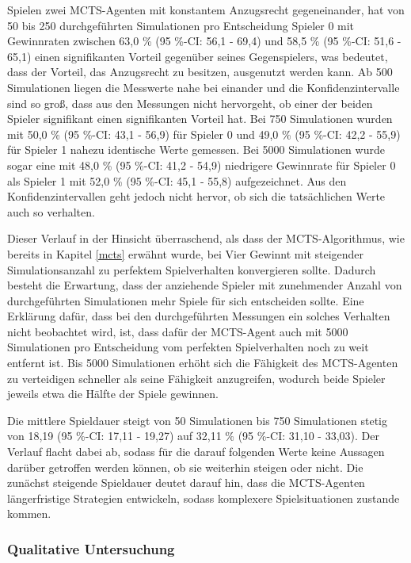 Spielen zwei MCTS-Agenten mit konstantem Anzugsrecht gegeneinander, hat von 50 bis 250 durchgeführten Simulationen pro Entscheidung Spieler 0 mit Gewinnraten zwischen 63,0 \% (95 \%-CI: 56,1 - 69,4) und 58,5 \% (95 \%-CI: 51,6 - 65,1) einen signifikanten Vorteil gegenüber seines Gegenspielers, was bedeutet, dass der Vorteil, das Anzugsrecht zu besitzen, ausgenutzt werden kann. Ab 500 Simulationen liegen die Messwerte nahe bei einander und die Konfidenzintervalle sind so groß, dass aus den Messungen nicht hervorgeht, ob einer der beiden Spieler signifikant einen signifikanten Vorteil hat. Bei 750 Simulationen wurden mit 50,0 \% (95 \%-CI: 43,1 - 56,9) für Spieler 0 und 49,0 \% (95 \%-CI: 42,2 - 55,9) für Spieler 1 nahezu identische Werte gemessen. Bei 5000 Simulationen wurde sogar eine mit 48,0 \% (95 \%-CI: 41,2 - 54,9) niedrigere Gewinnrate für Spieler 0 als Spieler 1 mit 52,0 \% (95 \%-CI: 45,1 - 55,8) aufgezeichnet. Aus den Konfidenzintervallen geht jedoch nicht hervor, ob sich die tatsächlichen Werte auch so verhalten.

Dieser Verlauf in der Hinsicht überraschend, als dass der MCTS-Algorithmus, wie bereits in Kapitel \ref{mcts} erwähnt wurde, bei Vier Gewinnt mit steigender Simulationsanzahl zu perfektem Spielverhalten konvergieren sollte. Dadurch besteht die Erwartung, dass der anziehende Spieler mit zunehmender Anzahl von durchgeführten Simulationen mehr Spiele für sich entscheiden sollte. Eine Erklärung dafür, dass bei den durchgeführten Messungen ein solches Verhalten nicht beobachtet wird, ist, dass dafür der MCTS-Agent auch mit 5000 Simulationen pro Entscheidung vom perfekten Spielverhalten noch zu weit entfernt ist. Bis 5000 Simulationen erhöht sich die Fähigkeit des MCTS-Agenten zu verteidigen schneller als seine Fähigkeit anzugreifen, wodurch beide Spieler jeweils etwa die Hälfte der Spiele gewinnen.

Die mittlere Spieldauer steigt von 50 Simulationen bis 750 Simulationen stetig von 18,19 (95 \%-CI: 17,11 - 19,27) auf 32,11 \% (95 \%-CI: 31,10 - 33,03). Der Verlauf flacht dabei ab, sodass für die darauf folgenden Werte keine Aussagen darüber getroffen werden können, ob sie weiterhin steigen oder nicht. Die zunächst steigende Spieldauer deutet darauf hin, dass die MCTS-Agenten längerfristige Strategien entwickeln, sodass komplexere Spielsituationen zustande kommen.

\subsubsection{Qualitative Untersuchung}

